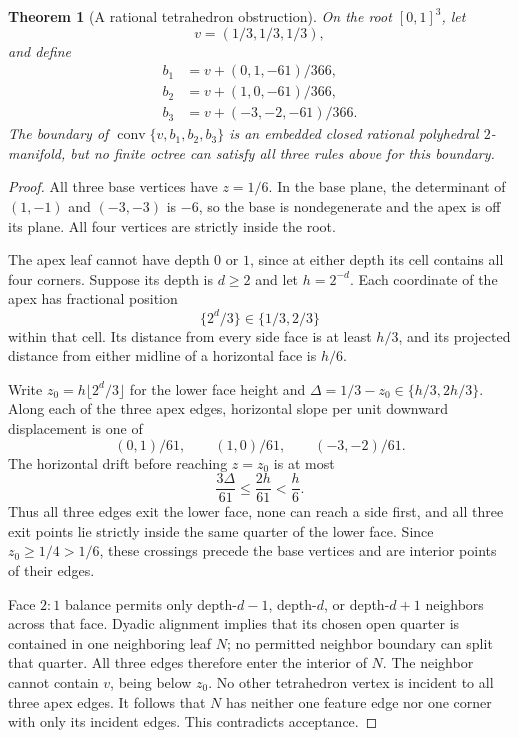\documentclass[11pt]{article}
\newtheorem{theorem}{Theorem}[section]
\theoremstyle{definition}
\theoremstyle{remark}
\newcommand{\conv}{\operatorname{conv}}
\begin{document}
\begin{theorem}[A rational tetrahedron obstruction]
\label{thm:tetrahedron}
On the root $[0,1]^3$, let
\[
  v=(1/3,1/3,1/3),
\]
and define
\begin{align*}
 b_1&=v+(0,1,-61)/366,\\
 b_2&=v+(1,0,-61)/366,\\
 b_3&=v+(-3,-2,-61)/366.
\end{align*}
The boundary of $\conv\{v,b_1,b_2,b_3\}$ is an embedded closed rational
polyhedral $2$-manifold, but no finite octree can satisfy all three rules
above for this boundary.
\end{theorem}

\begin{proof}
All three base vertices have $z=1/6$. In the base plane, the determinant
of $(1,-1)$ and $(-3,-3)$ is $-6$, so the base is nondegenerate and the
apex is off its plane. All four vertices are strictly inside the root.

The apex leaf cannot have depth $0$ or $1$, since at either depth its
cell contains all four corners. Suppose its depth is $d\ge2$ and let
$h=2^{-d}$. Each coordinate of the apex has fractional position
\[
  \{2^d/3\}\in\{1/3,2/3\}
\]
within that cell. Its distance from every side face is at least $h/3$,
and its projected distance from either midline of a horizontal face is
$h/6$.

Write $z_0=h\lfloor 2^d/3\rfloor$ for the lower face height and
$\Delta=1/3-z_0\in\{h/3,2h/3\}$. Along each of the three apex edges,
horizontal slope per unit downward displacement is one of
\[
  (0,1)/61,\qquad(1,0)/61,\qquad(-3,-2)/61.
\]
The horizontal drift before reaching $z=z_0$ is at most
\[
  \frac{3\Delta}{61}\le\frac{2h}{61}<\frac h6.
  \tag{4}\label{eq:tetra-drift}
\]
Thus all three edges exit the lower face, none can reach a side first,
and all three exit points lie strictly inside the same quarter of the
lower face. Since $z_0\ge1/4>1/6$, these crossings precede the base
vertices and are interior points of their edges.

Face $2{:}1$ balance permits only depth-$d-1$, depth-$d$, or depth-$d+1$
neighbors across that face. Dyadic alignment implies that its chosen
open quarter is contained in one neighboring leaf $N$; no permitted
neighbor boundary can split that quarter. All three edges therefore
enter the interior of $N$. The neighbor cannot contain $v$, being below
$z_0$. No other tetrahedron vertex is incident to all three apex edges.
It follows that $N$ has neither one feature edge nor one corner with
only its incident edges. This contradicts acceptance.
\end{proof}
\end{document}
